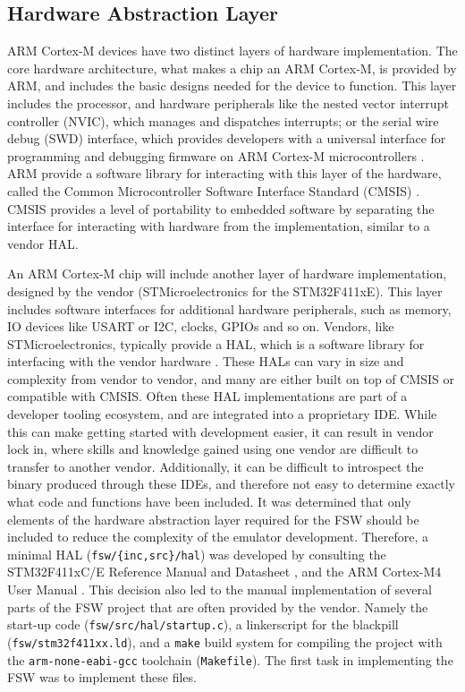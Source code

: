 \documentclass[../report.tex]{subfiles}
\begin{document}
\subsection{Hardware Abstraction Layer} \label{sec:fsw-hal}

ARM Cortex-M devices have two distinct layers of hardware implementation. The
core hardware architecture, what makes a chip an ARM Cortex-M, is provided by
ARM, and includes the basic designs needed for the device to function. This
layer includes the processor, and hardware peripherals like the nested vector
interrupt controller (NVIC), which manages and dispatches interrupts; or the
serial wire debug (SWD) interface, which provides developers with a universal
interface for programming and debugging firmware on ARM Cortex-M
microcontrollers \citep{armcm4_manual}. ARM provide a software library for
interacting with this layer of the hardware, called the Common Microcontroller
Software Interface Standard (CMSIS) \citep{CMSIS}. CMSIS provides a level of portability to
embedded software by separating the interface for interacting with hardware
from the implementation, similar to a vendor HAL.

An ARM Cortex-M chip will include another layer of hardware implementation,
designed by the vendor (STMicroelectronics for the STM32F411xE). This
layer includes software interfaces for additional hardware peripherals, such as
memory, IO devices like USART or I2C, clocks, GPIOs and so on. Vendors, like
STMicroelectronics, typically provide a HAL, which is a software library for
interfacing with the vendor hardware \citep{stm32hal}. These HALs can vary in
size and complexity from vendor to vendor, and many are either built on top of
CMSIS or compatible with CMSIS.
Often these HAL implementations are part of a developer tooling
ecosystem, and are integrated into a proprietary IDE. While this can make
getting started with development easier, it can result in vendor lock in, where
skills and knowledge gained using one vendor are difficult to transfer to
another vendor. Additionally, it can be difficult to introspect the binary
produced through these IDEs, and therefore not easy to determine exactly what
code and functions have been included.
It was determined that only elements of the hardware abstraction layer required
for the FSW should be included to reduce the complexity of the emulator
development. Therefore, a minimal HAL (\lstinline|fsw/{inc,src}/hal|) was
developed by consulting the STM32F411xC/E Reference Manual and Datasheet
\citep{stm32f4_manual, stm32f4_datasheet}, and the ARM Cortex-M4 User Manual
\citep{armcm4_manual}. This decision also led to the manual implementation of
several parts of the FSW project that are often provided by the vendor. Namely
the start-up code (\lstinline|fsw/src/hal/startup.c|), a linkerscript for the
blackpill (\lstinline|fsw/stm32f411xx.ld|), and a \lstinline|make| build system
for compiling the project with the \lstinline|arm-none-eabi-gcc| toolchain
(\lstinline|Makefile|). The first task in implementing the FSW was to implement
these files.
\end{document}
